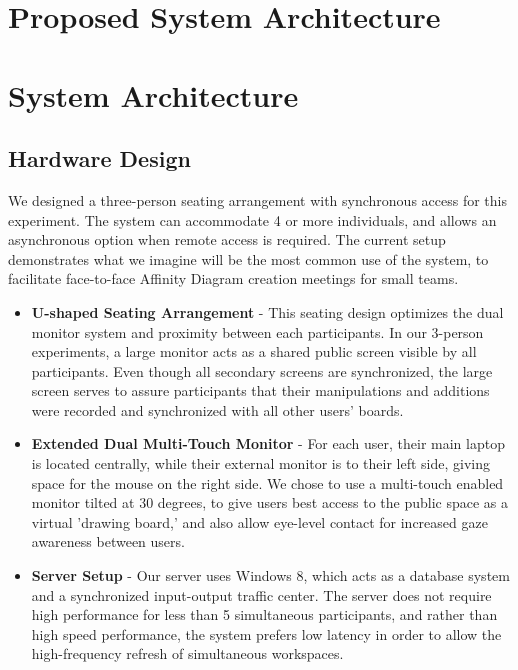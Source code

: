 \documentclass{sigchi}
\begin{document}
\section{Proposed System Architecture}


\section{System Architecture}


\subsection{Hardware Design}


We designed a three-person seating arrangement with synchronous access for this experiment. The system can accommodate 4 or more individuals, and allows an asynchronous option when remote access is required. The current setup demonstrates what we imagine will be the most common use of the system, to facilitate face-to-face Affinity Diagram creation meetings for small teams. 

\begin{itemize}

\item \textbf{U-shaped Seating Arrangement} - This seating design optimizes the dual monitor system and proximity between each participants. In our 3-person experiments, a large monitor acts as a shared public screen visible by all participants. Even though all secondary screens are synchronized, the large screen serves to assure participants that their manipulations and additions were recorded and synchronized with all other users' boards. 
\item \textbf{Extended Dual Multi-Touch Monitor} - For each user, their main laptop is located centrally, while their external monitor is to their left side, giving space for the mouse on the right side. We chose to use a multi-touch enabled monitor tilted at 30 degrees, to give users best access to the public space as a virtual 'drawing board,' and also allow eye-level contact for increased gaze awareness between users. 
\item \textbf{Server Setup} - Our server uses Windows 8, which acts as a database system and a synchronized input-output traffic center. The server does not require high performance for less than 5 simultaneous participants, and rather than high speed performance, the system prefers low latency in order to allow the high-frequency refresh of simultaneous workspaces.
\end{itemize}
\end{document}
